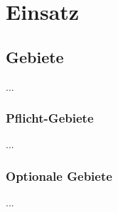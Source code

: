 %
%


\chapter{Einsatz}
\label{Einsatz}


\section{Gebiete}

...
\\


\subsection{Pflicht-Gebiete}

...
\\


\subsection{Optionale Gebiete}

...
\\


